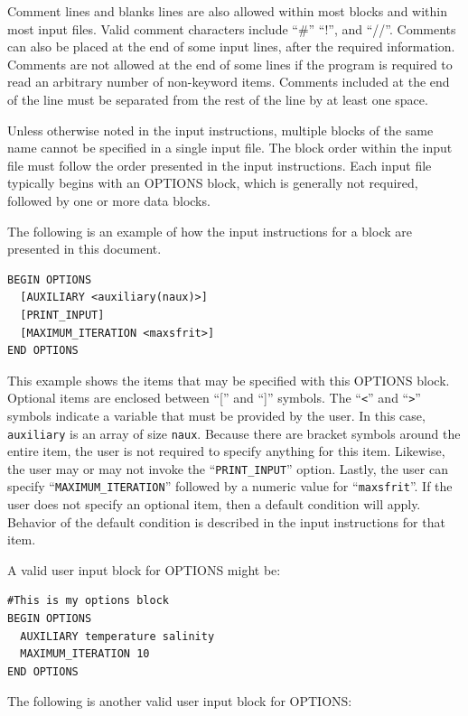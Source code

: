 Comment lines and blanks lines are also allowed within most blocks and within most input files.  Valid comment characters include ``\#'' ``!'', and ``//''.  Comments can also be placed at the end of some input lines, after the required information.  Comments are not allowed at the end of some lines if the program is required to read an arbitrary number of non-keyword items.  Comments included at the end of the line must be separated from the rest of the line by at least one space.

Unless otherwise noted in the input instructions, multiple blocks of the same name cannot be specified in a single input file.  The block order within the input file must follow the order presented in the input instructions.  Each input file typically begins with an OPTIONS block, which is generally not required, followed by one or more data blocks.

The following is an example of how the input instructions for a block are presented in this document.  
\begin{lstlisting}[style=blockdefinition]
BEGIN OPTIONS
  [AUXILIARY <auxiliary(naux)>]
  [PRINT_INPUT]
  [MAXIMUM_ITERATION <maxsfrit>]
END OPTIONS
\end{lstlisting}
This example shows the items that may be specified with this OPTIONS block.  Optional items are enclosed between ``['' and ``]'' symbols.  The ``\texttt{<}'' and ``\texttt{>}'' symbols indicate a variable that must be provided by the user.  In this case, \texttt{auxiliary} is an array of size \texttt{naux}.  Because there are bracket symbols around the entire item, the user is not required to specify anything for this item.  Likewise, the user may or may not invoke the ``\texttt{PRINT\_INPUT}'' option.  Lastly, the user can specify ``\texttt{MAXIMUM\_ITERATION}'' followed by a numeric value for ``\texttt{maxsfrit}''.  If the user does not specify an optional item, then a default condition will apply.  Behavior of the default condition is described in the input instructions for that item.

\vspace{6pt}\noindent A valid user input block for OPTIONS might be:

\begin{lstlisting}[style=inputfile]
#This is my options block
BEGIN OPTIONS
  AUXILIARY temperature salinity
  MAXIMUM_ITERATION 10
END OPTIONS
\end{lstlisting}

\noindent The following is another valid user input block for OPTIONS:

